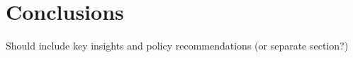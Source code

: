 \chapter{Conclusions}

Should include key insights and policy recommendations (or separate section?)